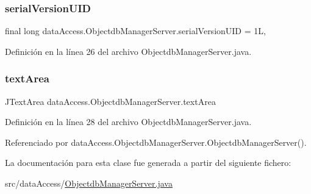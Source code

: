 \subsubsection{\texorpdfstring{serialVersionUID}{serialVersionUID}}
{\footnotesize\ttfamily final long data\+Access.\+Objectdb\+Manager\+Server.\+serial\+Version\+U\+ID = 1L\hspace{0.3cm}{\ttfamily [static]}, {\ttfamily [private]}}



Definición en la línea 26 del archivo Objectdb\+Manager\+Server.\+java.

\mbox{\label{classdataAccess_1_1ObjectdbManagerServer_ab739ebdf3a077579c9af7a881c620fd4}} 
\subsubsection{\texorpdfstring{textArea}{textArea}}
{\footnotesize\ttfamily J\+Text\+Area data\+Access.\+Objectdb\+Manager\+Server.\+text\+Area\hspace{0.3cm}{\ttfamily [package]}}



Definición en la línea 28 del archivo Objectdb\+Manager\+Server.\+java.



Referenciado por data\+Access.\+Objectdb\+Manager\+Server.\+Objectdb\+Manager\+Server().



La documentación para esta clase fue generada a partir del siguiente fichero\+:\begin{DoxyCompactItemize}
\item 
src/data\+Access/\mbox{\hyperlink{ObjectdbManagerServer_8java}{Objectdb\+Manager\+Server.\+java}}\end{DoxyCompactItemize}
